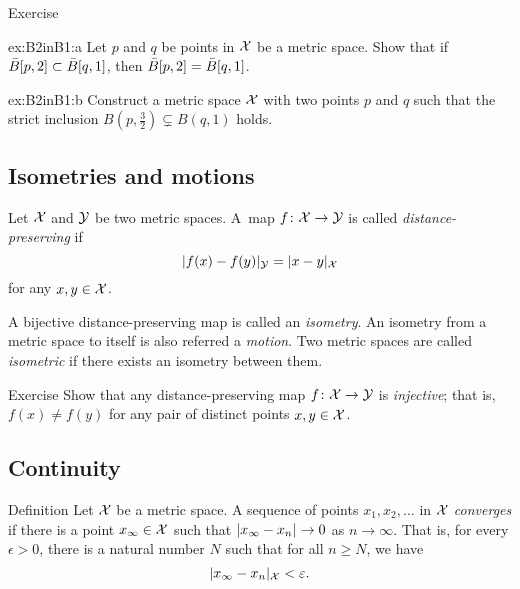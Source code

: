 \begin{multicols}{2}
{\begin{thm}{Exercise}\label{ex:B2inB1}

\begin{subthm}{ex:B2inB1:a}
Let $p$ and $q$ be points in $\mathcal{X}$ be a metric space.
Show that if $\bar B[p,2]\z\subset \bar B[q,1]$, then $\bar B[p,2]\z=\bar B[q,1]$.
\end{subthm}

\begin{subthm}{ex:B2inB1:b}
Construct a metric space $\mathcal{X}$ with two points $p$ and $q$ such that the strict inclusion
$B(p,\tfrac32)\subsetneq B(q,1)$ holds.
\end{subthm}

\end{thm}

\subsection*{Isometries and motions} 

Let $\mathcal{X}$ and $\mathcal{Y}$ be two metric spaces. 
A~map $f\:\spc{X} \z\to \spc{Y}$
is
called \emph{distance-preserving} if 
$$\dist{f(x)}{f(y)}{\spc{Y}}
 = \dist{x}{y}{\spc{X}}$$
for any $x,y\in {\mathcal{X}}$.

A bijective distance-preserving map is called an \emph{isometry}. 
An isometry from a metric space to itself is also referred a \emph{motion}.
Two metric spaces are called {}\emph{isometric} if there exists an isometry between them.

\begin{thm}{Exercise}\label{ex:dist-preserv=>injective}
Show that any distance-preserving map $f\colon\mathcal{X}\to\mathcal{Y}$ is \emph{injective};
that is, $f(x)\ne f(y)$ for any pair of distinct points $x, y\in \mathcal{X}$.
\end{thm}

\subsection*{Continuity}

\begin{thm}{Definition}
 Let ${\mathcal{X}}$ be a metric space.
A sequence of points $x_1, x_2, \ldots$ in ${\mathcal{X}}$ {}\emph{converges}
if there is a point
$x_\infty\in {\mathcal{X}}$ such that $\dist{x_\infty}{x_n}{}\to 0$ as $n\to\infty$.  
That is, for every $\epsilon > 0$, there is a natural number $N$ such that for all $n \ge N$, we have
\[
\dist{x_\infty}{x_n}{\spc{X}}
<
\epsilon.
\]


\end{thm}}
\end{multicols}
